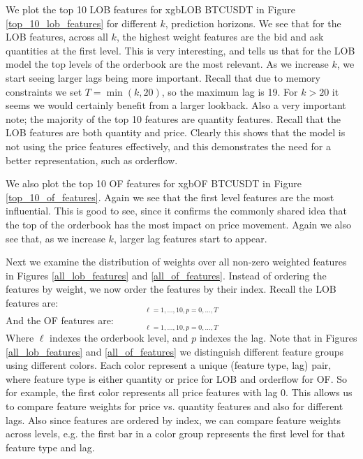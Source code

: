 We plot the top 10 LOB features for xgbLOB BTCUSDT in Figure \ref{top_10_lob_features} for different $k$, prediction horizons.
We see that for the LOB features, across all $k$, the highest weight features are 
the bid and ask quantities at the first level. This is very interesting,
and tells us that for the LOB model the top levels of the orderbook are the most relevant.
As we increase $k$, we start seeing larger lags being more important.  Recall that due to memory constraints
we set $T=\min(k, 20)$, so the maximum lag is 19. For $k > 20$ it seems
we would certainly benefit from a larger lookback.
Also a very important note; the majority of the top 10 features are quantity features. Recall
that the LOB features are both quantity and price. Clearly this shows that the model
is not using the price features effectively, and this demonstrates the need for a better
representation, such as orderflow.

We also plot the top 10 OF features for xgbOF BTCUSDT in Figure \ref{top_10_of_features}.
Again we see that the first level features are the most influential. This is good to see,
since it confirms the commonly shared idea that the top of the orderbook has the
most impact on price movement. Again we also see that, as we increase $k$, larger lag features
start to appear.

Next we examine the distribution of weights over all non-zero weighted features in Figures \ref{all_lob_features}
and \ref{all_of_features}. Instead of ordering the features by weight, we now order the features
by their index. Recall the LOB features are:
\begin{equation*}
    [\text{ask}\_\text{price}\_\ell\_\text{lag}\_p, \text{ask}\_\text{qty}\_\ell\_\text{lag}\_p, \text{bid}\_\text{price}\_\ell\_\text{lag}\_p, \text{bid}\_\text{qty}\_\ell\_\text{lag}\_p]_{\ell = 1, ..., 10, p = 0, ..., T}
\end{equation*}
And the OF features are:
\begin{equation*}
    [\text{ask}\_\text{orderflow}\_\ell\_\text{lag}\_p, \text{bid}\_\text{orderflow}\_\ell\_\text{lag}\_p]_{\ell = 1, ..., 10, p = 0, ..., T}
\end{equation*}
Where $\ell$ indexes the orderbook level, and $p$ indexes the lag.
Note that in Figures \ref{all_lob_features} and \ref{all_of_features} we distinguish different feature groups using different colors.
Each color represent a unique (feature type, lag) pair, where feature type is either quantity or price for LOB and orderflow for OF.
So for example, the first color represents all price features with lag 0. This allows us to compare feature weights
for price vs. quantity features and also for different lags. Also since features are ordered by index, we can compare
feature weights across levels, e.g. the first bar in a color group represents the first level for that feature type and lag.

